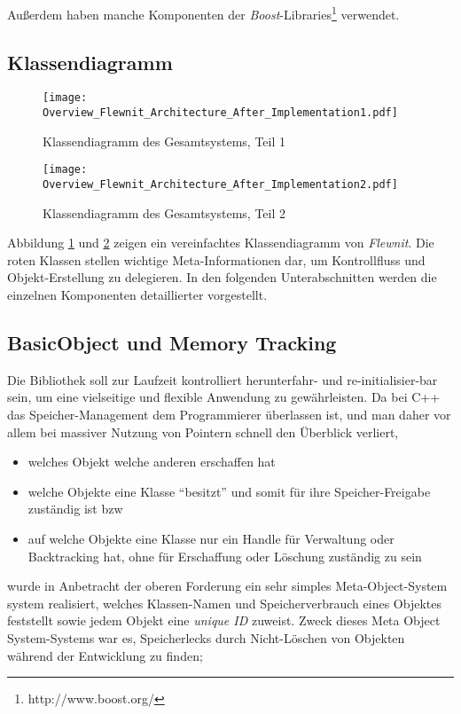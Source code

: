 	Außerdem haben manche Komponenten der \emph{Boost}-Libraries\footnote{http://www.boost.org/} verwendet.
	
	


\subsection{Klassendiagramm}

\begin{figure}[!h]
	\texttt{[image: Overview\_Flewnit\_Architecture\_After\_Implementation1.pdf]}
	\caption{Klassendiagramm des Gesamtsystems, Teil 1}
	\label{fig:ClassDiagOverview1}
\end{figure}


\begin{figure}[!h]
	\texttt{[image: Overview\_Flewnit\_Architecture\_After\_Implementation2.pdf]}
	\caption{Klassendiagramm des Gesamtsystems, Teil 2}
	\label{fig:ClassDiagOverview2}
\end{figure}



Abbildung \ref{fig:ClassDiagOverview1} und \ref{fig:ClassDiagOverview2} zeigen ein vereinfachtes Klassendiagramm
von \emph{Flewnit}. Die roten Klassen stellen wichtige Meta-Informationen dar, um Kontrollfluss und Objekt-Erstellung
zu delegieren. In den folgenden Unterabschnitten werden die einzelnen Komponenten detaillierter vorgestellt.




 
\subsection{BasicObject und Memory Tracking}
	\lstset{language=C++} %
	
	Die Bibliothek soll zur Laufzeit kontrolliert herunterfahr- und re-initialisier-bar sein, 
	um eine vielseitige und flexible Anwendung zu gewährleisten. Da bei C++ das Speicher-Management dem
	Programmierer überlassen ist, und man daher vor allem bei massiver Nutzung von Pointern schnell den Überblick
	verliert, 
	\begin{itemize}
		\item welches Objekt welche anderen erschaffen hat
		\item welche Objekte eine Klasse "`besitzt"' und somit für ihre Speicher-Freigabe zuständig ist bzw
		\item auf welche Objekte eine Klasse nur ein Handle für Verwaltung oder	Backtracking hat, ohne für Erschaffung
		 oder Löschung zuständig zu sein
	\end{itemize}
	wurde in Anbetracht der oberen Forderung ein sehr simples Meta-Object-System system realisiert, welches Klassen-Namen
	und Speicherverbrauch eines Objektes feststellt sowie jedem Objekt eine \emph{unique ID} zuweist.
	Zweck dieses Meta Object System-Systems war es, Speicherlecks durch Nicht-Löschen von Objekten während der Entwicklung 
	zu finden;
	
